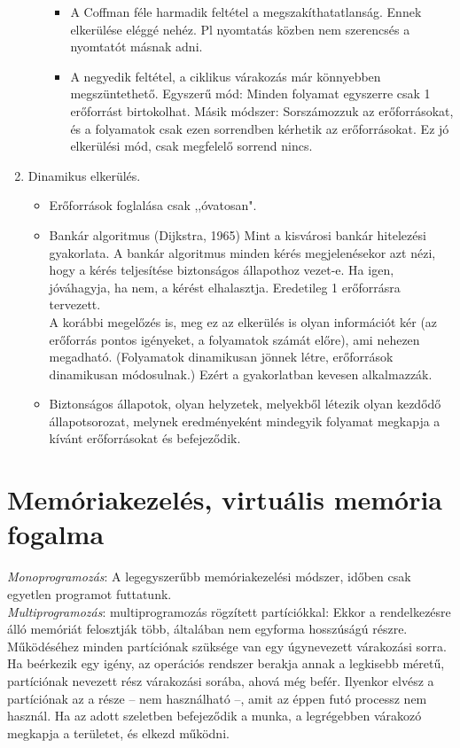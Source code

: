 \documentclass[margin=0px]{article}
\begin{document}
\begin{enumerate}
\begin{itemize}
\begin{itemize}
                        \item A Coffman féle harmadik feltétel a megszakíthatatlanság. Ennek elkerülése eléggé
                              nehéz. Pl nyomtatás közben nem szerencsés a nyomtatót másnak adni.
                        \item A negyedik feltétel, a ciklikus várakozás már könnyebben megszüntethető. Egyszerű mód: Minden folyamat egyszerre csak 1 erőforrást birtokolhat. Másik módszer: Sorszámozzuk az erőforrásokat, és a folyamatok csak ezen sorrendben kérhetik az erőforrásokat. Ez jó elkerülési mód, csak megfelelő sorrend nincs.
                    \end{itemize}
          \end{itemize}
    \item Dinamikus elkerülés.
          \begin{itemize}
              \item Erőforrások foglalása csak ,,óvatosan".
              \item Bankár algoritmus (Dijkstra, 1965) Mint a kisvárosi bankár hitelezési gyakorlata. A bankár algoritmus minden kérés megjelenésekor azt nézi, hogy a kérés teljesítése biztonságos
                    állapothoz vezet-e. Ha igen, jóváhagyja, ha nem, a kérést elhalasztja. Eredetileg 1 erőforrásra tervezett. \\
                    A korábbi megelőzés is, meg ez az elkerülés is olyan információt kér (az erőforrás pontos igényeket, a folyamatok számát előre), ami nehezen megadható. (Folyamatok dinamikusan jönnek létre, erőforrások dinamikusan módosulnak.) Ezért a gyakorlatban kevesen alkalmazzák.
              \item Biztonságos állapotok, olyan helyzetek, melyekből létezik olyan kezdődő állapotsorozat, melynek eredményeként mindegyik folyamat megkapja a kívánt erőforrásokat és befejeződik.
          \end{itemize}
\end{enumerate}

\section{Memóriakezelés, virtuális memória fogalma}

\textit{Monoprogramozás}: A legegyszerűbb memóriakezelési módszer, időben csak egyetlen programot futtatunk. \\
\textit{Multiprogramozás}: multiprogramozás rögzített partíciókkal: Ekkor a rendelkezésre álló memóriát felosztják több, általában nem egyforma hosszúságú részre. Működéséhez minden partíciónak szüksége van egy úgynevezett várakozási sorra. Ha beérkezik egy igény, az operációs rendszer berakja annak a legkisebb méretű, partíciónak nevezett rész várakozási sorába, ahová még befér. Ilyenkor elvész a partíciónak az a része – nem használható –, amit az éppen futó processz nem használ. Ha az adott szeletben befejeződik a munka, a legrégebben várakozó megkapja a területet, és elkezd működni.
\end{document}
